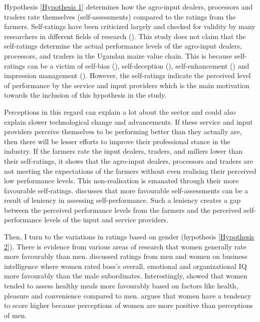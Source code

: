 \documentclass[12pt,english]{article}\usepackage[]{graphicx}\usepackage[]{color}
\begin{document}
\begin{onehalfspace}
Hypothesis \ref{Hypothesis 1} determines how the agro-input dealers,
processors and traders rate themselves (self-assessments) compared
to the ratings from the farmers. Self-ratings have been criticized
largely and checked for validity by many researchers in different
fields of research (\citealp{Heneman1974,Lowman1987,Horwood2021}).
This study does not claim that the self-ratings determine the actual
performance levels of the agro-input dealers, processors, and traders
in the Ugandan maize value chain. This is because self-ratings can
be a victim of self-bias (\citealp{Sui2017}), self-deception (\citealp{von2011evolution}),
self-enhancement (\citealp{Sedikides2008,Alicke2009}) and impression
management (\citealp{Wayne1995}). However, the self-ratings indicate
the perceived level of performance by the service and input providers
which is the main motivation towards the inclusion of this hypothesis
in the study. 

Perceptions in this regard can explain a lot about the sector and
could also explain slower technological change and advancements. If
these service and input providers perceive themselves to be performing
better than they actually are, then there will be lesser efforts to
improve their professional stance in the industry. If the farmers
rate the input dealers, traders, and millers lower than their self-ratings,
it shows that the agro-input dealers, processors and traders are not
meeting the expectations of the farmers without even realising their
perceived low performance levels. This non-realisation is emanated
through their more favourable self-ratings. \citet{Cheng2017} discusses
that more favourable self-assessments can be a result of leniency
in assessing self-performance. Such a leniency creates a gap between
the perceived performance levels from the farmers and the perceived
self-performance levels of the input and service providers.

Then, I turn to the variations in ratings based on gender (hypothesis
\ref{Hypothesis 2}). There is evidence from various areas of research
that women generally rate more favourably than men. \citet{Furnham2005}
discussed ratings from men and women on business intelligence where
women rated boss's overall, emotional and organizational IQ more favourably
than the male subordinates. Interestingly, \citet{Rappoport1993}
showed that women tended to assess healthy meals more favourably based
on factors like health, pleasure and convenience compared to men.
\citet{Winquist1998} argues that women have a tendency to score higher
because perceptions of women are more positive than perceptions of
men. 


\end{onehalfspace}
\end{document}
